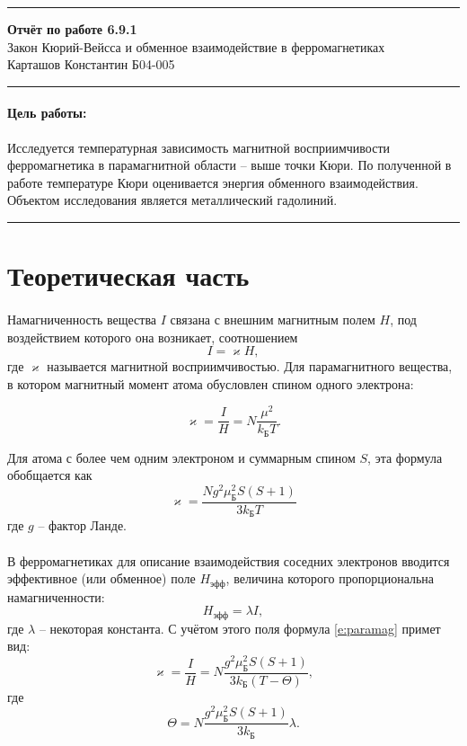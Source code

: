 \documentclass[a4paper,12pt]{article} %
\begin{document}


\hrule 	
\medskip
\begin{raggedright}
{\large \textbf{Отчёт по работе 6.9.1}}
\\
\medskip
{\Large Закон Кюрий-Вейсса и обменное взаимодействие в ферромагнетиках} 
\\
\medskip
{\large Карташов Константин Б04-005}
\medskip
\hrule
\medskip
\end{raggedright}


\paragraph{Цель работы:} 
	Исследуется температурная зависимость магнитной восприимчивости ферромагнетика в парамагнитной области -- выше точки Кюри. По полученной в работе температуре Кюри оценивается энергия обменного взаимодействия. Объектом исследования является металлический гадолиний.

\medskip\hrule\medskip

\section{Теоретическая часть}

\paragraph{}
	Намагниченность вещества $I$ связана с внешним магнитным полем $H$, под воздействием которого она возникает, соотношением 
	\[
	I = \varkappa H,
	\]
	где $\varkappa$ называется магнитной восприимчивостью. Для парамагнитного вещества, в котором магнитный момент атома обусловлен спином одного электрона:

	\[
	\varkappa = \dfrac{I}{H} = N\dfrac{\mu^2}{k_{\text{Б}}T}.
	\]
	
	Для атома с более чем одним электроном и суммарным спином $S$, эта формула обобщается как
	\begin{equation}
	\varkappa = \dfrac{Ng^2 \mu_{\text{Б}}^2S(S+1)}{3k_{\text{Б}}T}
	\label{e:paramag}
	\end{equation}
	где $g$ -- фактор Ланде.

\paragraph{}
	В ферромагнетиках для описание взаимодействия соседних электронов вводится эффективное (или обменное) поле $H_{\text{эфф}}$, величина которого пропорциональна намагниченности:
	\[
	H_{\text{эфф}} = \lambda I,
	\]
	где $\lambda$ -- некоторая константа. С учётом этого поля формула \eqref{e:paramag} примет вид:
	\[
	\varkappa = \dfrac{I}{H} = N\dfrac{g^2 \mu_{\text{Б}}^2 S(S+1)}{3k_{\text{Б}}(T-\Theta)},
	\]
	где 
	\[
	\Theta = N \dfrac{g^2 \mu_{\text{Б}}^2 S(S+1)}{3k_{\text{Б}}}\lambda.
	\]
	
\end{document}
